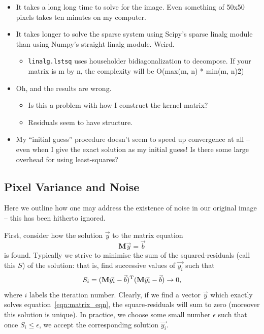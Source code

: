 \documentclass[letterpaper, 11pt]{article}
\def\ra{\ensuremath{\rightarrow}\xspace}
\begin{document}
\begin{itemize}
	\item It takes a long long time to solve for the image. Even something of 50x50 pixels takes ten minutes on my computer.
	\item It takes longer to solve the sparse system using Scipy's sparse linalg module than using Numpy's straight linalg module. Weird.
	\begin{itemize}
		\item \texttt{linalg.lstsq} uses householder bidiagonalization to decompose. If your matrix is m by n, the complexity will be O(max(m, n) * min(m, n)\^2)
	\end{itemize}
	\item Oh, and the results are wrong.
	\begin{itemize}
		\item Is this a problem with how I construct the kernel matrix?
		\item Residuals seem to have structure.
	\end{itemize}	
	\item My ``initial guess'' procedure doesn't seem to speed up convergence at all -- even when I give the exact solution as my initial guess! Is there some large overhead for using least-squares?
\end{itemize}

\subsection{Pixel Variance and Noise}
\label{sec:pixvar}

Here we outline how one may address the existence of noise in our original image -- this has been hitherto ignored.

First, consider how the solution $\vec y$ to the matrix equation
\begin{equation}
	\mathbf M \vec y = \vec b \label{eqn:matrix_eqn}
\end{equation}
is found. Typically we strive to minimise the sum of the squared-residuals (call this $S$) of the solution: that is, find successive values of $\vec {y_i}$ such that
\begin{equation} \label{eqn:sum_residuals}
	S_i = (\mathbf M \vec{y_i} - \vec b)^{\rm T}(\mathbf M \vec{y_i} - \vec b) \ra 0,
\end{equation}
where $i$ labels the iteration number. Clearly, if we find a vector $\vec y$ which exactly solves equation~\ref{eqn:matrix_eqn}, the square-residuals will sum to zero (moreover this solution is unique). In practice, we choose some small number $\epsilon$ such that once $S_i \leq \epsilon$, we accept the corresponding solution $\vec {y_i}$.
\end{document}
